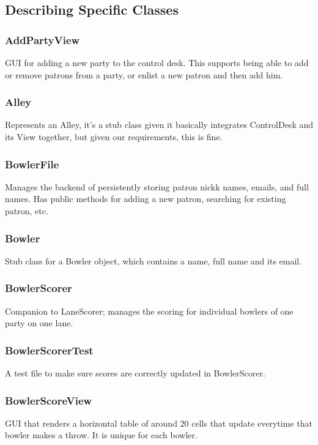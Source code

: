 \subsection{Describing Specific Classes}

\subsubsection{AddPartyView}
GUI for adding a new party to the control desk. This supports being able to add or remove patrons from a party, or enlist a new patron and then add him.

\subsubsection{Alley}
Represents an Alley, it's a stub class given it basically integrates ControlDesk and its View together, but given our requirements, this is fine.

\subsubsection{BowlerFile}
Manages the backend of persistently storing patron nickk names, emails, and full names. Has public methods for adding a new patron, searching for existing patron, etc.

\subsubsection{Bowler}
Stub class for a Bowler object, which contains a name, full name and its email.

\subsubsection{BowlerScorer}
Companion to LaneScorer; manages the scoring for individual bowlers of one party on one lane.

\subsubsection{BowlerScorerTest}
A test file to make sure scores are correctly updated in BowlerScorer.

\subsubsection{BowlerScoreView}
GUI that renders a horizontal table of around 20 cells that update everytime that bowler makes a throw. It is unique for each bowler.
